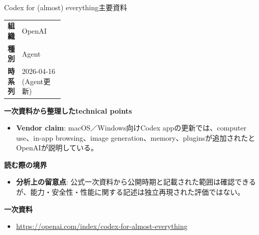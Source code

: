 \begin{technicalnote}{Codex for (almost) everything}{主要資料}
\begingroup
\begin{tabularx}{\linewidth}{@{}>{\bfseries}p{0.22\linewidth}X@{}}
組織 & OpenAI \\
種別 & Agent \\
時系列 & 2026-04-16 (Agent更新) \\
\end{tabularx}
\smallskip
{\bfseries 一次資料から整理したtechnical points}
\begin{itemize}[leftmargin=1.5em,itemsep=0.35em]
\item \textbf{Vendor claim}: macOS／Windows向けCodex appの更新では、computer use、in-app browsing、image generation、memory、pluginsが追加されたとOpenAIが説明している。
\end{itemize}
\begin{minipage}{\linewidth}
{\bfseries 読む際の境界}
\begin{itemize}[leftmargin=1.5em,itemsep=0.35em]
\item \textbf{分析上の留意点}: 公式一次資料から公開時期と記載された範囲は確認できるが、能力・安全性・性能に関する記述は独立再現された評価ではない。
\end{itemize}
\begin{samepage}
{\bfseries 一次資料}
\begingroup\sloppy
\begin{itemize}[leftmargin=1.5em,itemsep=0.25em]
\item {\scriptsize\url{https://openai.com/index/codex-for-almost-everything}}
\end{itemize}
\endgroup
\end{samepage}
\end{minipage}
\endgroup
\end{technicalnote}
\medskip

